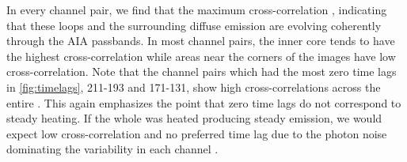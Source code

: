 In every channel pair, we find that the maximum cross-correlation , indicating that these loops and the surrounding diffuse emission are evolving coherently through the AIA passbands.
In most channel pairs, the inner core tends to have the highest cross-correlation while areas near the corners of the images have low cross-correlation.
Note that the channel pairs which had the most zero time lags in \autoref{fig:timelags}, 211-193 and 171-131, show high cross-correlations across the entire \AR{}.
This again emphasizes the point that zero time lags do not correspond to steady heating.
If the whole \AR{} was heated producing steady emission, we would expect low cross-correlation and no preferred time lag due to the photon noise dominating the variability in each channel \citep{viall_signatures_2016}.
